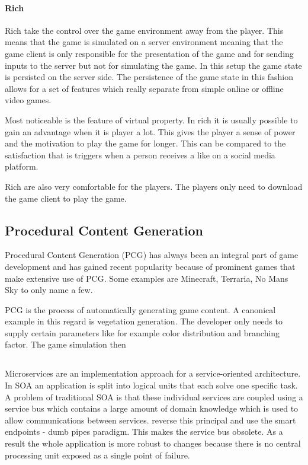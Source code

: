 \paragraph{Rich \ogs{}}

Rich \ogs{} take the control over the game environment away from the player.
This means that the game is simulated on a server environment meaning that the
game client is only responsible for the presentation of the game and for sending
inputs to the server but not for simulating the game. In this setup the game
state is persisted on the server side. The persistence of the game state in this
fashion allows for a set of features which really separate \ogs{} from simple
online or offline video games.

Most noticeable is the feature of virtual property. In rich \ogs{} it is usually
possible to gain an advantage when it is player a lot. This gives the player a
sense of power and the motivation to play the game for longer. This can be
compared to the satisfaction that is triggers when a person receives a like on a
social media platform.

Rich \ogs{} are also very comfortable for the players. The players only need to
download the game client to play the game.

\subsection{Procedural Content Generation}

Procedural Content Generation (PCG) has always been an integral part of game
development and has gained recent popularity because of prominent games that
make extensive use of PCG. Some examples are Minecraft, Terraria, No Mans Sky to
only name a few.

PCG is the process of automatically generating game content. A canonical
example in this regard is vegetation generation. The developer only needs to
supply certain parameters like for example color distribution and branching
factor. The game simulation then 

\subsection{\mss{}}

Microservices are an implementation approach for a service-oriented
architecture. In SOA an application is split into logical units
that each solve one specific task. A problem of traditional SOA is that these
individual services are coupled using a service bus which contains a large
amount of domain knowledge which is used to allow communications between
services. \mss{} reverse this principal and use the smart endpoints - dumb pipes
paradigm. This makes the service bus obsolete. As a result the whole
application is more robust to changes because there is no central processing
unit exposed as a single point of failure.

